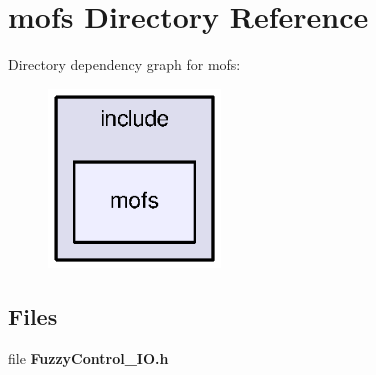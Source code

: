 \section{mofs Directory Reference}
\label{dir_1289251f0e34c7592c231ad6ed120349}
Directory dependency graph for mofs\-:\nopagebreak
\begin{figure}[H]
\begin{center}
\leavevmode
\includegraphics[width=130pt]{dir_1289251f0e34c7592c231ad6ed120349_dep}
\end{center}
\end{figure}
\subsection*{Files}
\begin{DoxyCompactItemize}
\item 
file {\bf Fuzzy\-Control\-\_\-\-I\-O.\-h}
\end{DoxyCompactItemize}
